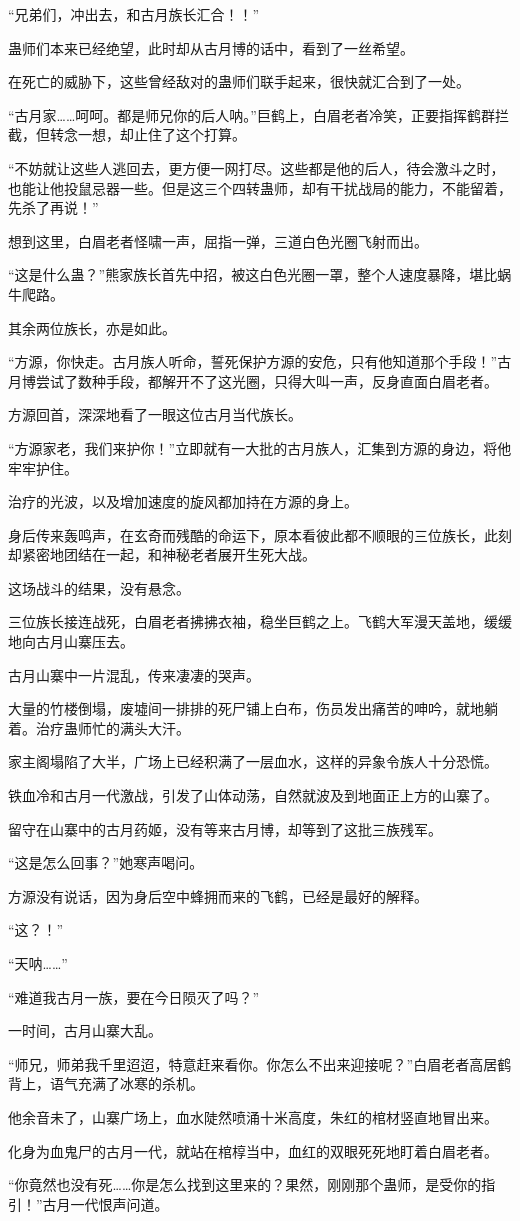 \begin{this_body}
“兄弟们，冲出去，和古月族长汇合！！”

蛊师们本来已经绝望，此时却从古月博的话中，看到了一丝希望。

在死亡的威胁下，这些曾经敌对的蛊师们联手起来，很快就汇合到了一处。

“古月家……呵呵。都是师兄你的后人呐。”巨鹤上，白眉老者冷笑，正要指挥鹤群拦截，但转念一想，却止住了这个打算。

“不妨就让这些人逃回去，更方便一网打尽。这些都是他的后人，待会激斗之时，也能让他投鼠忌器一些。但是这三个四转蛊师，却有干扰战局的能力，不能留着，先杀了再说！”

想到这里，白眉老者怪啸一声，屈指一弹，三道白色光圈飞射而出。

“这是什么蛊？”熊家族长首先中招，被这白色光圈一罩，整个人速度暴降，堪比蜗牛爬路。

其余两位族长，亦是如此。

“方源，你快走。古月族人听命，誓死保护方源的安危，只有他知道那个手段！”古月博尝试了数种手段，都解开不了这光圈，只得大叫一声，反身直面白眉老者。

方源回首，深深地看了一眼这位古月当代族长。

“方源家老，我们来护你！”立即就有一大批的古月族人，汇集到方源的身边，将他牢牢护住。

治疗的光波，以及增加速度的旋风都加持在方源的身上。

身后传来轰鸣声，在玄奇而残酷的命运下，原本看彼此都不顺眼的三位族长，此刻却紧密地团结在一起，和神秘老者展开生死大战。

这场战斗的结果，没有悬念。

三位族长接连战死，白眉老者拂拂衣袖，稳坐巨鹤之上。飞鹤大军漫天盖地，缓缓地向古月山寨压去。

古月山寨中一片混乱，传来凄凄的哭声。

大量的竹楼倒塌，废墟间一排排的死尸铺上白布，伤员发出痛苦的呻吟，就地躺着。治疗蛊师忙的满头大汗。

家主阁塌陷了大半，广场上已经积满了一层血水，这样的异象令族人十分恐慌。

铁血冷和古月一代激战，引发了山体动荡，自然就波及到地面正上方的山寨了。

留守在山寨中的古月药姬，没有等来古月博，却等到了这批三族残军。

“这是怎么回事？”她寒声喝问。

方源没有说话，因为身后空中蜂拥而来的飞鹤，已经是最好的解释。

“这？！”

“天呐……”

“难道我古月一族，要在今日陨灭了吗？”

一时间，古月山寨大乱。

“师兄，师弟我千里迢迢，特意赶来看你。你怎么不出来迎接呢？”白眉老者高居鹤背上，语气充满了冰寒的杀机。

他余音未了，山寨广场上，血水陡然喷涌十米高度，朱红的棺材竖直地冒出来。

化身为血鬼尸的古月一代，就站在棺椁当中，血红的双眼死死地盯着白眉老者。

“你竟然也没有死……你是怎么找到这里来的？果然，刚刚那个蛊师，是受你的指引！”古月一代恨声问道。

\end{this_body}

